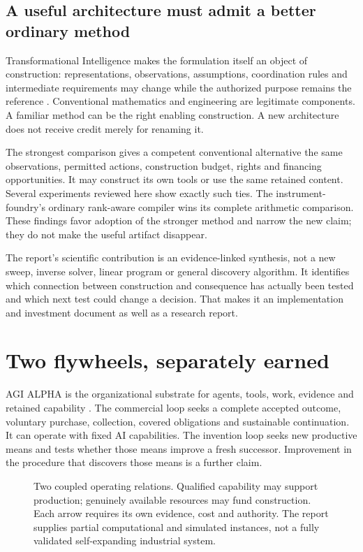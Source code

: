 \documentclass[11pt,letterpaper]{article}
\begin{document}
\subsection{A useful architecture must admit a better ordinary method}
Transformational Intelligence makes the formulation itself an object of construction: representations, observations, assumptions, coordination rules and intermediate requirements may change while the authorized purpose remains the reference \cite{ti}. Conventional mathematics and engineering are legitimate components. A familiar method can be the right enabling construction. A new architecture does not receive credit merely for renaming it.

The strongest comparison gives a competent conventional alternative the same observations, permitted actions, construction budget, rights and financing opportunities. It may construct its own tools or use the same retained content. Several experiments reviewed here show exactly such ties. The instrument-foundry's ordinary rank-aware compiler wins its complete arithmetic comparison. These findings favor adoption of the stronger method and narrow the new claim; they do not make the useful artifact disappear.

The report's scientific contribution is an evidence-linked synthesis, not a new sweep, inverse solver, linear program or general discovery algorithm. It identifies which connection between construction and consequence has actually been tested and which next test could change a decision. That makes it an implementation and investment document as well as a research report.

\section{Two flywheels, separately earned}
AGI ALPHA is the organizational substrate for agents, tools, work, evidence and retained capability \cite{foundation}. The commercial loop seeks a complete accepted outcome, voluntary purchase, collection, covered obligations and sustainable continuation. It can operate with fixed AI capabilities. The invention loop seeks new productive means and tests whether those means improve a fresh successor. Improvement in the procedure that discovers those means is a further claim.

\begin{figure}[htbp]\centering
\caption{Two coupled operating relations. Qualified capability may support production; genuinely available resources may fund construction. Each arrow requires its own evidence, cost and authority. The report supplies partial computational and simulated instances, not a fully validated self-expanding industrial system.}\label{fig:architecture}
\end{figure}
\end{document}
